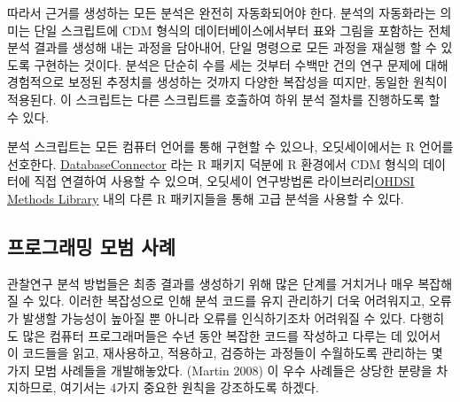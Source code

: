 \documentclass[11pt]{book}
\theoremstyle{definition}
\theoremstyle{definition}
\theoremstyle{definition}
\theoremstyle{remark}
\begin{document}
따라서 근거를 생성하는 모든 분석은 완전히 자동화되어야 한다. 분석의
자동화라는 의미는 단일 스크립트에 CDM 형식의 데이터베이스에서부터 표와
그림을 포함하는 전체 분석 결과를 생성해 내는 과정을 담아내어, 단일
명령으로 모든 과정을 재실행 할 수 있도록 구현하는 것이다. 분석은 단순히
수를 세는 것부터 수백만 건의 연구 문제에 대해 경험적으로 보정된 추정치를
생성하는 것까지 다양한 복잡성을 띠지만, 동일한 원칙이 적용된다. 이
스크립트는 다른 스크립트를 호출하여 하위 분석 절차를 진행하도록 할 수
있다.

분석 스크립트는 모든 컴퓨터 언어를 통해 구현할 수 있으나, 오딧세이에서는
R 언어를 선호한다.
\href{https://ohdsi.github.io/DatabaseConnector/}{DatabaseConnector}
라는 R 패키지 덕분에 R 환경에서 CDM 형식의 데이터에 직접 연결하여 사용할
수 있으며, 오딧세이 연구방법론
라이브러리\href{https://ohdsi.github.io/MethodsLibrary/}{OHDSI Methods
Library} 내의 다른 R 패키지들을 통해 고급 분석을 사용할 수 있다.

\subsection{프로그래밍 모범 사례}\label{--}

관찰연구 분석 방법들은 최종 결과를 생성하기 위해 많은 단계를 거치거나
매우 복잡해질 수 있다. 이러한 복잡성으로 인해 분석 코드를 유지 관리하기
더욱 어려워지고, 오류가 발생할 가능성이 높아질 뿐 아니라 오류를
인식하기조차 어려워질 수 있다. 다행히도 많은 컴퓨터 프로그래머들은 수년
동안 복잡한 코드를 작성하고 다루는 데 있어서 이 코드들을 읽고,
재사용하고, 적용하고, 검증하는 과정들이 수월하도록 관리하는 몇 가지 모범
사례들을 개발해놓았다. (Martin 2008) 이 우수 사례들은 상당한 분량을
차지하므로, 여기서는 4가지 중요한 원칙을 강조하도록 하겠다.
\end{document}
